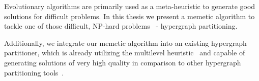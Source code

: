 \documentclass[a4paper,12pt,titlepage, BCOR7mm,headsepline]{scrbook}
\numberwithin{equation}{section}
\begin{document}
Evolutionary algorithms are primarily used as a meta-heuristic to generate good solutions for difficult problems. In this thesis we present a memetic algorithm to tackle one of those difficult, NP-hard problems~\cite{garey2002computers} - hypergraph partitioning. 

Additionally, we integrate our memetic algorithm into an existing hypergraph partitioner, which is already utilizing the multilevel heuristic~\cite{bulucc2016recent} and capable of generating solutions of very high quality in comparison to other hypergraph partitioning tools~\cite{schlag2016k}. 

%
%
%
%
%
%
\end{document}
